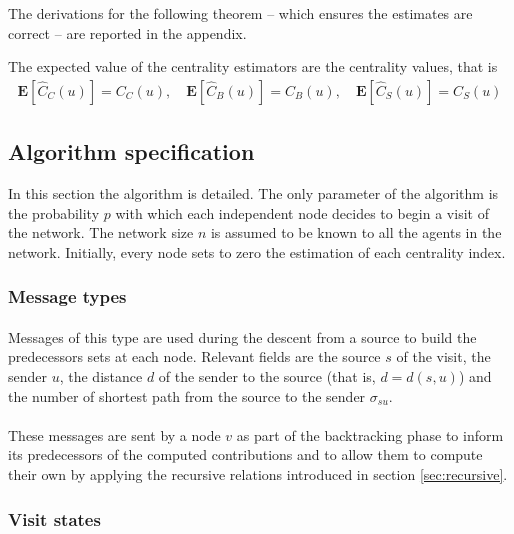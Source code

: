 The derivations for the following theorem -- which ensures the estimates are correct -- are reported in the appendix.

\begin{theorem}
The expected value of the centrality estimators are the centrality values, that is
\begin{eqnarray*}
\mathbf{E}[\widehat{C}_C(u)] = C_C(u), \quad
\mathbf{E}[\widehat{C}_B(u)] = C_B(u), \quad
\mathbf{E}[\widehat{C}_S(u)] = C_S(u) 
\end{eqnarray*}
\end{theorem}

\subsection{Algorithm specification}

In this section the algorithm is detailed. The only parameter of the algorithm is the probability $p$ with which each independent node decides to begin a visit of the network. The network size $n$ is assumed to be known to all the agents in the network. Initially, every node sets to zero the estimation of each centrality index.

\subsubsection{Message types}

\paragraph{} Messages of this type are used during the descent from a source to build the predecessors sets at each node. Relevant fields are the source $s$ of the visit, the sender $u$, the distance $d$ of the sender to the source (that is, $d = d(s,u)$) and the number of shortest path from the source to the sender $\sigma_{su}$.

\paragraph{} These messages are sent by a node $v$ as part of the backtracking phase to inform its predecessors of the computed contributions and to allow them to compute their own by applying the recursive relations introduced in section \ref{sec:recursive}.

\subsubsection{Visit states}

